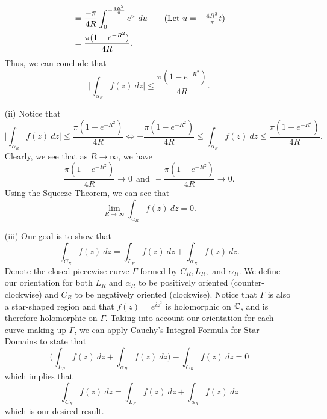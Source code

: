 \documentclass[a4paper]{article}
\begin{document}
\begin{solution}
\begin{enumerate}
\begin{align*}
                                                              &= \frac{ -\pi  }{ 4R } \int_{ 0 }^{ - \frac{ 4 R^{2} }{ \pi  }  }  e^{u} \ du \tag{Let \( u = - \frac{ 4 R^{2} }{ \pi  } t  \)} \\
                                                              &= \frac{ \pi (1 - e^{- R^{2}}) }{ 4R }.
        \end{align*}
        Thus, we can conclude that
        \[  \Big| \int_{ {\alpha}_{R} }^{  } f(z) \ dz \Big| \leq \frac{ \pi (1 - e^{- R^{2}}) }{ 4R }. \]
        \item[(ii)] Notice that 
            \[  \Big| \int_{ {\alpha}_{R} }^{  } f(z) \ dz  \Big|  \leq \frac{ \pi (1 - e^{- R^{2}}) }{ 4R  } \iff - \frac{ \pi (1 - e^{- R^{2}}) }{ 4 R  }  \leq \int_{ {\alpha}_{R} }^{  } f(z) \ dz \leq \frac{ \pi (1 - e^{-R^{2}}) }{ 4R }. \]
            Clearly, we see that as \( R \to \infty   \), we have
            \[  \frac{ \pi (1 - e^{- R^{2}}) }{ 4R  } \to 0 \ \ \text{and} \ \ - \frac{ \pi (1 - e^{- R^{2}}) }{ 4 R  } \to 0.  \]
            Using the Squeeze Theorem, we can see that
            \[  \lim_{ R \to \infty  }  \int_{ {\alpha}_{R} }^{  } f(z) \ dz = 0.  \]
        \item[(iii)] 
            Our goal is to show that 
            \[ \int_{ {C}_{R} }^{  } f(z) \ dz = \int_{ {L}_{R} }^{  } f(z) \ dz + \int_{ {\alpha}_{R} }^{   } f(z) \ dz. \]
            Denote the closed piecewise curve \( \Gamma \) formed by \( {C}_{R}, {L}_{R},  \) and \( {\alpha}_{R} \). We define our orientation for both \( {L}_{R}  \) and \( {\alpha}_{R} \) to be positively oriented (counter-clockwise) and \( {C}_{R} \) to be negatively oriented (clockwise). Notice that \( \Gamma \) is also a star-shaped region and that \( f(z) = e^{i z^{2}}  \) is holomorphic on \( \mathbb{C}  \), and is therefore holomorphic on \(  \Gamma \). Taking into account our orientation for each curve making up \( \Gamma \), we can apply Cauchy's Integral Formula for Star Domains to state that
            \[ \Big( \int_{ {L}_{R} }^{  } f(z) \ dz + \int_{ {\alpha}_{R} }^{  } f(z) \ dz \Big) - \int_{ {C}_{R} }^{  } f(z) \ dz = 0   \]
            which implies that 
            \[  \int_{ {C}_{R} }^{  } f(z) \ dz = \int_{ {L}_{R} }^{  } f(z)  \ dz + \int_{ {\alpha}_{R} }^{  } f(z) \ dz  \]
            which is our desired result.


\end{enumerate}
\end{solution}
\end{document}
